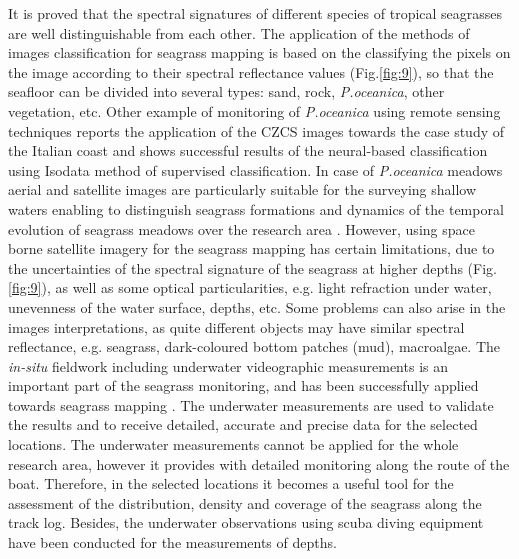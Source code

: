 \documentclass[11pt]{article}
\begin{document}
It is proved \cite{Thorhaug07} \label{Thorhaug07} that the spectral signatures of different species of tropical seagrasses are well
distinguishable from each other. The application of the methods of images classification for seagrass
mapping is based on the classifying the pixels on the image according to their spectral reflectance
values (Fig.\ref{fig:9})\cite{Fornes06}\label{Fornes06}, so that the seafloor can be divided into several types: sand, rock, \textit{P.oceanica}, other vegetation, etc\label{page-7}.
Other example of monitoring of \textit{P.oceanica} using remote sensing techniques \cite{Calvo03}\label{Calvo03}
reports the application of the \ac{CZCS} images towards the case study of the Italian coast and shows
successful results of the neural-based classification using Isodata method of supervised classification.
In case of \textit{P.oceanica} meadows aerial and satellite images are particularly suitable for the surveying
shallow waters \cite{Pasqualini98b}\label{Pasqualini98b} enabling to distinguish seagrass formations and dynamics of
the temporal evolution of seagrass meadows over the research area \cite{Pasqualini01}\label{Pasqualini01}.
However, using space borne satellite imagery for the seagrass mapping has certain limitations, due to
the uncertainties of the spectral signature of the seagrass at higher depths  (Fig.\ref{fig:9})\label{page-7}, as well as some
optical particularities, e.g. light refraction under water, unevenness of the water surface, depths, etc.
Some problems can also arise in the images interpretations, as quite different objects may have
similar spectral reflectance, e.g. seagrass, dark-coloured bottom patches (mud), macroalgae.
The \textit{in-situ} fieldwork including underwater videographic measurements is an important part of the
seagrass monitoring, and has been successfully applied towards seagrass mapping \cite{Haag08}\label{Haag08}.
The underwater measurements are used to validate the results and to receive detailed, accurate and
precise data for the selected locations. The underwater measurements cannot be applied for the whole
research area, however it provides with detailed monitoring along the route of the boat. Therefore, in
the selected locations it becomes a useful tool for the assessment of the distribution, density and
coverage of the seagrass along the track log. Besides, the underwater observations using scuba diving
equipment have been conducted for the measurements of depths.
\end{document}
